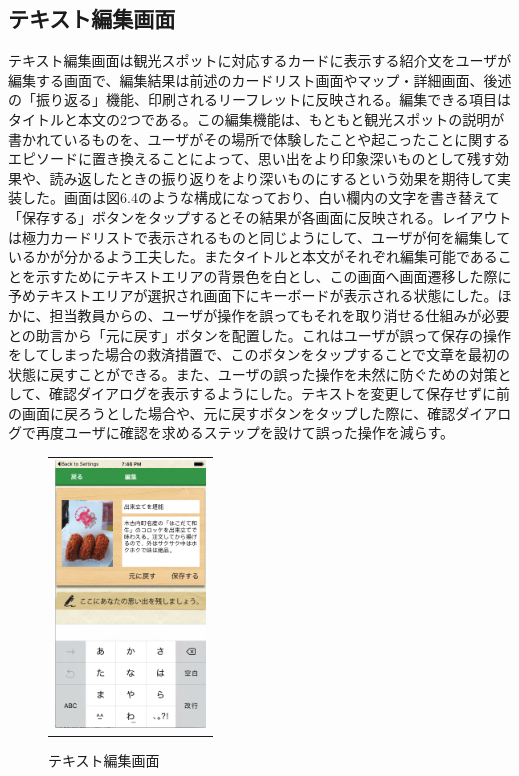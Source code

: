\subsection{テキスト編集画面}
テキスト編集画面は観光スポットに対応するカードに表示する紹介文をユーザが編集する画面で、編集結果は前述のカードリスト画面やマップ・詳細画面、後述の「振り返る」機能、印刷されるリーフレットに反映される。編集できる項目はタイトルと本文の2つである。この編集機能は、もともと観光スポットの説明が書かれているものを、ユーザがその場所で体験したことや起こったことに関するエピソードに置き換えることによって、思い出をより印象深いものとして残す効果や、読み返したときの振り返りをより深いものにするという効果を期待して実装した。画面は図6.4のような構成になっており、白い欄内の文字を書き替えて「保存する」ボタンをタップするとその結果が各画面に反映される。レイアウトは極力カードリストで表示されるものと同じようにして、ユーザが何を編集しているかが分かるよう工夫した。またタイトルと本文がそれぞれ編集可能であることを示すためにテキストエリアの背景色を白とし、この画面へ画面遷移した際に予めテキストエリアが選択され画面下にキーボードが表示される状態にした。ほかに、担当教員からの、ユーザが操作を誤ってもそれを取り消せる仕組みが必要との助言から「元に戻す」ボタンを配置した。これはユーザが誤って保存の操作をしてしまった場合の救済措置で、このボタンをタップすることで文章を最初の状態に戻すことができる。また、ユーザの誤った操作を未然に防ぐための対策として、確認ダイアログを表示するようにした。テキストを変更して保存せずに前の画面に戻ろうとした場合や、元に戻すボタンをタップした際に、確認ダイアログで再度ユーザに確認を求めるステップを設けて誤った操作を減らす。
\newpage

\begin{figure}[htbp]
  \begin{center}
    \begin{tabular}{c}

      \begin{minipage}{0.33\hsize}
        \begin{center}
\includegraphics[width=4cm, bb=0 0 303 573]{kiko_edit.png}
        \end{center}
      \end{minipage}

    \end{tabular}
    \caption{テキスト編集画面}
    \label{fig:lena}
  \end{center}
\end{figure}

